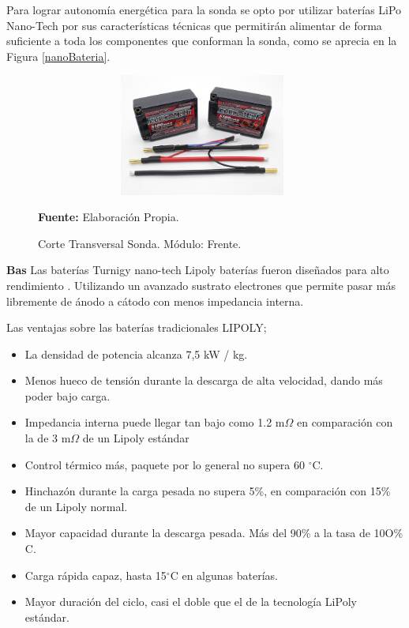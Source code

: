 Para lograr autonom\'ia energ\'etica para la sonda se opto por utilizar bater\'ias LiPo Nano-Tech por sus caracter\'isticas t\'ecnicas que permitir\'an alimentar de forma suficiente a toda los componentes que conforman la sonda, como se aprecia en la Figura \ref{nanoBateria}. 
    \begin{figure}[H]
        \centering
        \includegraphics[width=110mm, height=40mm]{Imagenes/2021/imag29.jpg}
        \caption[Corte Transversal]{Corte Transversal Sonda. M\'odulo: Frente.}\textbf{Fuente:} Elaboración Propia.
        \label{fig:nanoBateria}
    \end{figure}
    \item \textbf{Bas} Las bater\'ias Turnigy nano-tech Lipoly bater\'ias fueron dise\~nados para alto rendimiento . Utilizando un avanzado sustrato electrones que permite pasar m\'as libremente de \'anodo a c\'atodo con menos impedancia interna.
 
Las ventajas sobre las bater\'ias tradicionales LIPOLY;
\begin{itemize}
    \item La densidad de potencia alcanza 7,5 kW / kg.
    \item Menos hueco de tensi\'on durante la descarga de alta velocidad, dando m\'as poder bajo carga.
    \item Impedancia interna puede llegar tan bajo como 1.2 m${\Omega }$ en comparación con la de 3 m${\Omega }$ de un Lipoly estándar
    \item Control t\'ermico m\'as, paquete por lo general no supera 60 $^{\circ}$C.
    \item Hinchazón durante la carga pesada no supera 5\%, en comparación con 15\% de un Lipoly normal.
    \item Mayor capacidad durante la descarga pesada. M\'as del 90\% a la tasa de 10O\% C.
    \item Carga r\'apida capaz, hasta 15$^{\circ}$C en algunas baterías.
    \item Mayor duraci\'on del ciclo, casi el doble que el de la tecnolog\'ia LiPoly est\'andar.
\end{itemize}


